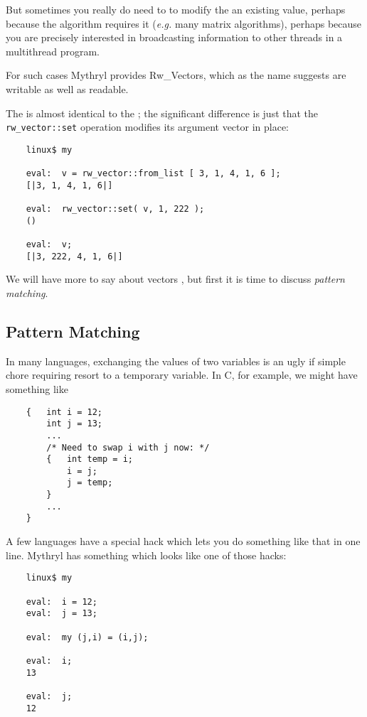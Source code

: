 But sometimes you really do need to to modify the an existing value, 
perhaps because the algorithm requires it ({\it e.g.} many matrix algorithms), 
perhaps because you are precisely interested in broadcasting information 
to other threads in a multithread program.

For such cases Mythryl provides Rw\_Vectors, which as the name suggests are 
writable as well as readable.

The  is almost identical to the 
;  the significant difference is just that the 
{\tt rw\_vector::set} operation modifies its argument vector in place:

\begin{verbatim}
    linux$ my

    eval:  v = rw_vector::from_list [ 3, 1, 4, 1, 6 ];
    [|3, 1, 4, 1, 6|]

    eval:  rw_vector::set( v, 1, 222 );
    ()

    eval:  v;
    [|3, 222, 4, 1, 6|]
\end{verbatim}

We will have more to say about vectors , 
but first it is time to discuss {\it pattern matching}.

\cutend*


\subsection{Pattern Matching}

In many languages, exchanging the values of two variables is an 
ugly if simple chore requiring resort to a temporary variable.  In 
C, for example, we might have something like

\begin{verbatim}
    {   int i = 12;
        int j = 13;
        ...
        /* Need to swap i with j now: */
        {   int temp = i;
            i = j;
            j = temp;
        }
        ...
    }
\end{verbatim}

A few languages have a special hack which lets you do something like that in 
one line.  Mythryl has something which looks like one of those hacks:

\begin{verbatim}
    linux$ my

    eval:  i = 12;
    eval:  j = 13;

    eval:  my (j,i) = (i,j);

    eval:  i;
    13

    eval:  j;
    12
\end{verbatim}

